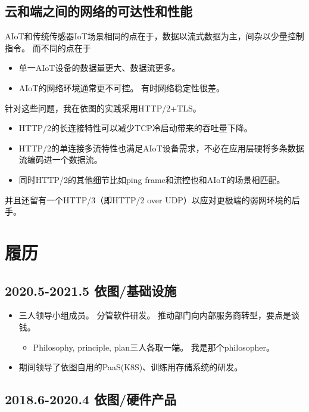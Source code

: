 \documentclass[scheme=plain]{ctexart}
\begin{document}
\subsection{云和端之间的网络的可达性和性能}

AIoT和传统传感器IoT场景相同的点在于，数据以流式数据为主，间杂以少量控制指令。
而不同的点在于
\begin{itemize}
    \item 单一AIoT设备的数据量更大、数据流更多。
    \item AIoT的网络环境通常更不可控。
        有时网络稳定性很差。
\end{itemize}
针对这些问题，我在依图的实践采用HTTP/2+TLS。
\begin{itemize}
    \item HTTP/2的长连接特性可以减少TCP冷启动带来的吞吐量下降。
    \item HTTP/2的单连接多流特性也满足AIoT设备需求，不必在应用层硬将多条数据流编码进一个数据流。
    \item 同时HTTP/2的其他细节比如ping frame和流控也和AIoT的场景相匹配。
\end{itemize}
并且还留有一个HTTP/3（即HTTP/2 over UDP）以应对更极端的弱网环境的后手。

\section{履历}

\subsection*{2020.5-2021.5 依图/基础设施}

\begin{itemize}
    \item 三人领导小组成员。
        分管软件研发。
        推动部门向内部服务商转型，要点是谈钱。
        \begin{itemize}
            \item Philosophy, principle, plan三人各取一端。
                我是那个philosopher。
        \end{itemize}
    \item 期间领导了依图自用的PaaS(K8S)、训练用存储系统的研发。
\end{itemize}

\subsection*{2018.6-2020.4 依图/硬件产品}
\end{document}
